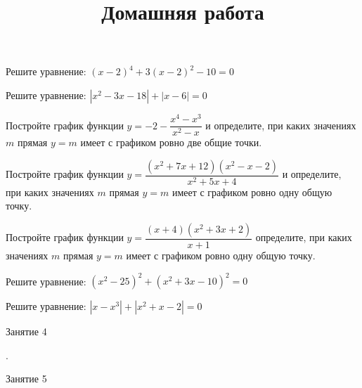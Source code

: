 \begin{class}[number=1]
	\begin{listofex}
		\item Решите уравнение: \quad \( (x-2)^4+3(x-2)^2-10=0 \)
		\item Решите уравнение: \quad \( |x^2-3x-18|+|x-6|=0 \)
		\item Постройте график функции \( y=-2-\dfrac{x^4-x^3}{x^2-x} \) и определите, при каких значениях \( m \) прямая \( y=m \) имеет с графиком ровно две общие точки.
		\item Постройте график функции \( y=\dfrac{(x^2+7x+12)(x^2-x-2)}{x^2+5x+4} \) и определите, при каких значениях \( m \) прямая \( y=m \) имеет с графиком ровно одну общую точку.
	\end{listofex}
	\newpage
	\title{Домашняя работа}
	\begin{listofex}
	\item Постройте график функции \( y=\dfrac{(x+4)(x^2+3x+2)}{x+1} \) определите, при каких значениях \( m \) прямая \( y=m \) имеет с графиком ровно одну общую точку.
	\item Решите уравнение: \quad \( (x^2-25)^2+(x^2+3x-10)^2=0 \)
	\item Решите уравнение: \quad \( |x-x^3|+|x^2+x-2|=0 \)
\end{listofex}
\end{class}

\begin{class}[number=4]
	\begin{listofex}
		\item Занятие 4
	\end{listofex}
\end{class}

\begin{homework}[number=1]
	\begin{listofex}
		\item .
	\end{listofex}
\end{homework}

\begin{class}[number=5]
	\begin{listofex}
		\item Занятие 5
	\end{listofex}
\end{class}

